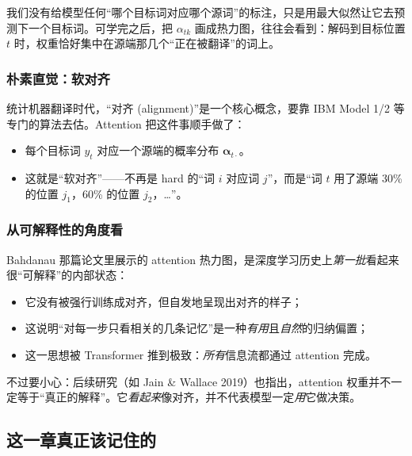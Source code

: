\begin{problemblock}
我们没有给模型任何“哪个目标词对应哪个源词”的标注，只是用最大似然让它去预测下一个目标词。可学完之后，把 $\alpha_{tk}$ 画成热力图，往往会看到：解码到目标位置 $t$ 时，权重恰好集中在源端那几个“正在被翻译”的词上。
\end{problemblock}

\subsubsection{朴素直觉：软对齐}

\begin{intuitionblock}
统计机器翻译时代，“对齐 (alignment)”是一个核心概念，要靠 IBM Model 1/2 等专门的算法去估。Attention 把这件事顺手做了：
\begin{itemize}
  \item 每个目标词 $y_t$ 对应一个源端的概率分布 $\boldsymbol{\alpha}_{t\cdot}$。
  \item 这就是“软对齐”——不再是 hard 的“词 $i$ 对应词 $j$”，而是“词 $t$ 用了源端 30\% 的位置 $j_1$，60\% 的位置 $j_2$，\ldots”。
\end{itemize}
\end{intuitionblock}

\subsubsection{从可解释性的角度看}

\begin{remark}
Bahdanau 那篇论文里展示的 attention 热力图，是深度学习历史上\emph{第一批}看起来很“可解释”的内部状态：
\begin{itemize}
  \item 它没有被强行训练成对齐，但自发地呈现出对齐的样子；
  \item 这说明“对每一步只看相关的几条记忆”是一种\emph{有用}且\emph{自然}的归纳偏置；
  \item 这一思想被 Transformer 推到极致：\emph{所有}信息流都通过 attention 完成。
\end{itemize}
不过要小心：后续研究（如 Jain \& Wallace 2019）也指出，attention 权重并不一定等于“真正的解释”。它\emph{看起来}像对齐，并不代表模型一定\emph{用}它做决策。
\end{remark}

\subsection{这一章真正该记住的}

